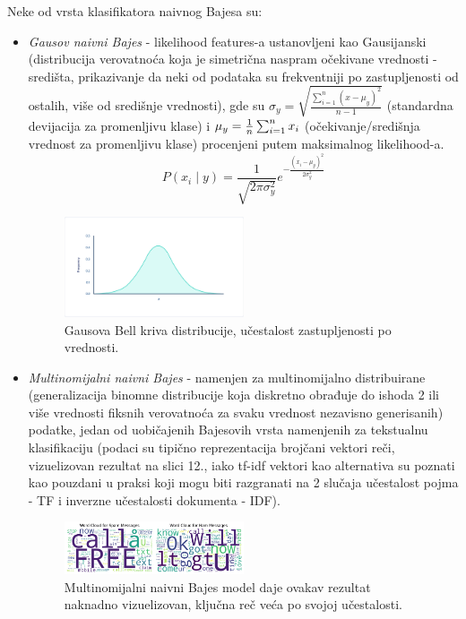 \documentclass[fontsize=12bp, paper=a4]{scrarticle}
\begin{document}
Neke od vrsta klasifikatora naivnog Bajesa su:
\begin{itemize}
    \item \textit{Gausov naivni Bajes} - likelihood features-a ustanovljeni kao Gausijanski (distribucija verovatnoća koja je simetrična naspram očekivane vrednosti - središta, prikazivanje da neki od podataka su frekventniji po zastupljenosti od ostalih, više od središnje vrednosti)\cite{gaus}, gde su $\sigma_y = \sqrt{\frac{\sum_{i=1}^n(x-\mu_y)^2}{n-1}}$ (standardna devijacija za promenljivu klase) i $\mu_y = {1\over n} \sum_{i=1}^n x_i $ (očekivanje/središnja vrednost za promenljivu klase) procenjeni putem maksimalnog likelihood-a.
    $$P(x_i \mid y) = \frac{1}{\sqrt{2\pi\sigma^2_y}} e^{-\frac{(x_i - \mu_y)^2}{2\sigma^2_y}}$$
    \begin{figure}[h!]
        \centering
        \includegraphics[width=0.5\textwidth]{image-11.png}
        \caption{\centering Gausova Bell kriva distribucije, učestalost zastupljenosti po vrednosti.}
    \end{figure}
    \item \textit{Multinomijalni naivni Bajes} - namenjen za multinomijalno distribuirane (generalizacija binomne distribucije koja diskretno obrađuje do ishoda 2 ili više vrednosti fiksnih verovatnoća za svaku vrednost nezavisno generisanih\cite{multinomial}) podatke, jedan od uobičajenih Bajesovih vrsta namenjenih za tekstualnu klasifikaciju (podaci su tipično reprezentacija brojčani vektori reči, vizuelizovan rezultat na slici 12., iako tf-idf vektori kao alternativa su poznati kao pouzdani u praksi koji mogu biti razgranati na 2 slučaja učestalost pojma - TF i inverzne učestalosti dokumenta - IDF).
    
    \begin{figure}[h!]
        \centering
        \includegraphics[width=0.5\textwidth]{image-12.png}
        \caption{\centering Multinomijalni naivni Bajes model daje ovakav rezultat naknadno vizuelizovan, ključna reč veća po svojoj učestalosti.}
    \end{figure}
    

\end{itemize}
\end{document}
